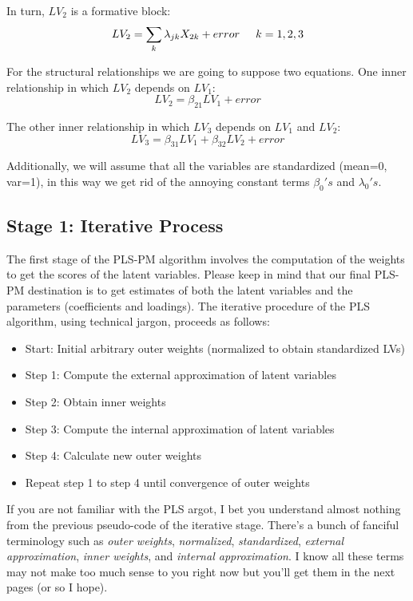 \documentclass[12pt]{book}\usepackage{graphicx, color}
\begin{document}
In turn, $LV_2$ is a formative block:
$$ LV_2 = \sum_{k} \lambda_{jk} X_{2k} + error  \hspace{5mm} k = 1, 2, 3$$

For the structural relationships we are going to suppose two equations. One inner relationship in which $LV_2$ depends on $LV_1$:
$$ LV_2 = \beta_{21} LV_1 + error $$

The other inner relationship in which $LV_3$ depends on $LV_1$ and $LV_2$:
$$ LV_3 = \beta_{31} LV_1 + \beta_{32} LV_2 + error $$

Additionally, we will assume that all the variables are standardized (mean=0, var=1), in this way we get rid of the annoying constant terms $\beta_{0}'s$ and $\lambda_{0}'s$. 


\subsection{Stage 1: Iterative Process}
The first stage of the PLS-PM algorithm involves the computation of the weights to get the scores of the latent variables. Please keep in mind that our final PLS-PM destination is to get estimates of both the latent variables and the parameters (coefficients and loadings). The iterative procedure of the PLS algorithm, using technical jargon, proceeds as follows:
\vspace{2mm}
\begin{itemize}
 \item Start: Initial arbitrary outer weights (normalized to obtain standardized LVs)
 \item Step 1: Compute the external approximation of latent variables
 \item Step 2: Obtain inner weights
 \item Step 3: Compute the internal approximation of latent variables
 \item Step 4: Calculate new outer weights
 \item[] Repeat step 1 to step 4 until convergence of outer weights
\end{itemize}
\vspace{2mm}

If you are not familiar with the PLS argot, I bet you understand almost nothing from the previous pseudo-code of the iterative stage. There's a bunch of fanciful terminology such as \textit{outer weights}, \textit{normalized}, \textit{standardized}, \textit{external approximation}, \textit{inner weights}, and \textit{internal approximation}. I know all these terms may not make too much sense to you right now but you'll get them in the next pages (or so I hope).
\end{document}
